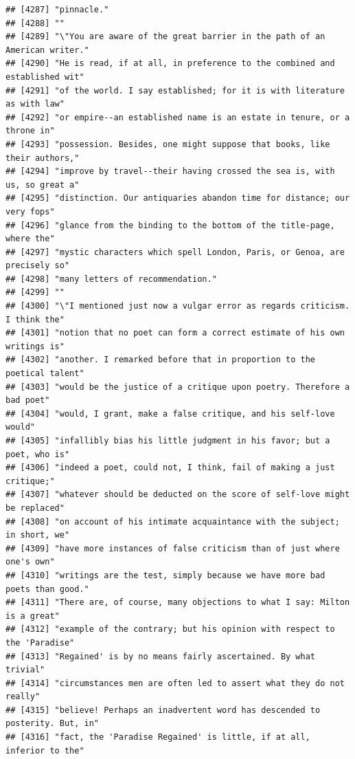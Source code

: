 \documentclass{article}\usepackage[]{graphicx}\usepackage[]{color}
\makeatletter
\newenvironment{kframe}{%
 \def\at@end@of@kframe{}%
 \ifinner\ifhmode%
  \def\at@end@of@kframe{\end{minipage}}%
  \begin{minipage}{\columnwidth}%
 \fi\fi%
 \def\FrameCommand##1{\hskip\@totalleftmargin \hskip-\fboxsep
 \colorbox{shadecolor}{##1}\hskip-\fboxsep
     \hskip-\linewidth \hskip-\@totalleftmargin \hskip\columnwidth}%
 \MakeFramed {\advance\hsize-\width
   \@totalleftmargin\z@ \linewidth\hsize
   \@setminipage}}%
 {\par\unskip\endMakeFramed%
 \at@end@of@kframe}
\newenvironment{knitrout}{}{} %
\makeatother
\begin{document}
\begin{knitrout}
\begin{kframe}
\begin{verbatim}
## [4287] "pinnacle."                                                                   
## [4288] ""                                                                            
## [4289] "\"You are aware of the great barrier in the path of an American writer."     
## [4290] "He is read, if at all, in preference to the combined and established wit"    
## [4291] "of the world. I say established; for it is with literature as with law"      
## [4292] "or empire--an established name is an estate in tenure, or a throne in"       
## [4293] "possession. Besides, one might suppose that books, like their authors,"      
## [4294] "improve by travel--their having crossed the sea is, with us, so great a"     
## [4295] "distinction. Our antiquaries abandon time for distance; our very fops"       
## [4296] "glance from the binding to the bottom of the title-page, where the"          
## [4297] "mystic characters which spell London, Paris, or Genoa, are precisely so"     
## [4298] "many letters of recommendation."                                             
## [4299] ""                                                                            
## [4300] "\"I mentioned just now a vulgar error as regards criticism. I think the"     
## [4301] "notion that no poet can form a correct estimate of his own writings is"      
## [4302] "another. I remarked before that in proportion to the poetical talent"        
## [4303] "would be the justice of a critique upon poetry. Therefore a bad poet"        
## [4304] "would, I grant, make a false critique, and his self-love would"              
## [4305] "infallibly bias his little judgment in his favor; but a poet, who is"        
## [4306] "indeed a poet, could not, I think, fail of making a just critique;"          
## [4307] "whatever should be deducted on the score of self-love might be replaced"     
## [4308] "on account of his intimate acquaintance with the subject; in short, we"      
## [4309] "have more instances of false criticism than of just where one's own"         
## [4310] "writings are the test, simply because we have more bad poets than good."     
## [4311] "There are, of course, many objections to what I say: Milton is a great"      
## [4312] "example of the contrary; but his opinion with respect to the 'Paradise"      
## [4313] "Regained' is by no means fairly ascertained. By what trivial"                
## [4314] "circumstances men are often led to assert what they do not really"           
## [4315] "believe! Perhaps an inadvertent word has descended to posterity. But, in"    
## [4316] "fact, the 'Paradise Regained' is little, if at all, inferior to the"         

\end{verbatim}
\end{kframe}
\end{knitrout}
\end{document}
